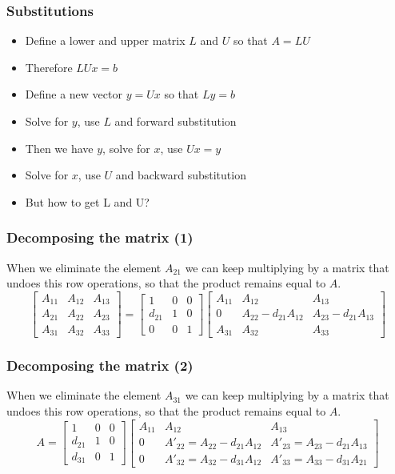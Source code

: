 \begin{frame}[fragile]
  \frametitle{Substitutions}
  \begin{itemize}
    \item Define a lower and upper matrix $L$ and $U$ so that $A = LU$
    \item Therefore $LUx = b$
    \item Define a new vector $y = Ux$ so that $Ly = b$
    \item Solve for $y$, use $L$ and forward substitution
    \item Then we have $y$, solve for $x$, use $Ux = y$
    \item Solve for $x$, use $U$ and backward substitution
    \item But how to get L and U?
  \end{itemize}
\end{frame}

\begin{frame}[fragile]
  \frametitle{Decomposing the matrix (1)}
  When we eliminate the element $A_{21}$ we can keep multiplying by a matrix that undoes this row operations, so that the product remains equal to $A$.
\[ 
\begin{bmatrix}
A_{11} & A_{12} & A_{13}\\ 
A_{21} & A_{22} & A_{23}\\ 
A_{31} & A_{32} & A_{33}
\end{bmatrix} = 
\begin{bmatrix}
1 & 0 & 0 \\
d_{21}& 1 & 0 \\
0 & 0 & 1
\end{bmatrix}
\begin{bmatrix}
A_{11} & A_{12} & A_{13}\\ 
0 & A_{22}-d_{21}A_{12} & A_{23}-d_{21}A_{13}\\ 
A_{31} & A_{32} & A_{33}
\end{bmatrix}
\]
\end{frame}

\begin{frame}[fragile]
  \frametitle{Decomposing the matrix (2)}
  When we eliminate the element $A_{31}$ we can keep multiplying by a matrix that undoes this row operations, so that the product remains equal to $A$.
\[ 
A = 
\begin{bmatrix}
1 & 0 & 0 \\
d_{21}& 1 & 0 \\
d_{31} & 0 & 1
\end{bmatrix}
\begin{bmatrix}
A_{11} & A_{12} & A_{13}\\ 
0 & A'_{22}=A_{22}-d_{21}A_{12} & A'_{23} = A_{23}-d_{21}A_{13}\\ 
0 & A'_{32} = A_{32}-d_{31}A_{12} & A'_{33} = A_{33}-d_{31}A_{21}
\end{bmatrix}
\]
\end{frame}

